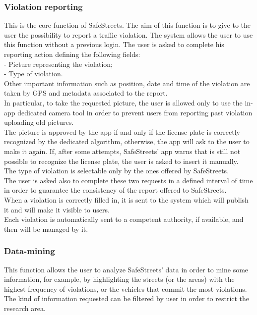 \documentclass{article}
\begin{document}
	\subsubsection{Violation reporting}
	This is the core function of SafeStreets. The aim of this function is to give to the user the possibility to report a traffic violation. The system allows the user to use this function without a previous login. The user is asked to complete his reporting action defining the following fields:\\
	- Picture representing the violation;\\
	- Type of violation.\\
	Other important information such as position, date and time of the violation are taken by GPS and metadata associated to the report.\\
	In particular, to take the requested picture, the user is allowed only to use the in-app dedicated camera tool in order to prevent users from reporting past violation uploading old pictures.\\ The picture is approved by the app if and only if the license plate is correctly recognized by the dedicated algorithm, otherwise, the app will ask to the user to make it again. If, after some attempts, SafeStreets' app warns that is still not possible to recognize the license plate, the user is asked to insert it manually. \\The type of violation is selectable only by the ones offered by SafeStreets.\\ The user is asked also to complete these two requests in a defined interval of time in order to guarantee the consistency of the report offered to SafeStreets.\\
	When a violation is correctly filled in, it is sent to the system which will publish it and will make it visible to users.\\
	Each violation is automatically sent to a competent authority, if available, and then will be managed by it.
	
	\subsubsection{Data-mining}
	This function allows the user to analyze SafeStreets' data in order to mine some information, for example, by highlighting the streets (or the areas) with the highest frequency of violations, or the vehicles that commit the most violations. The kind of information requested can be filtered by user in order to restrict the research area. \\
	
\end{document}
